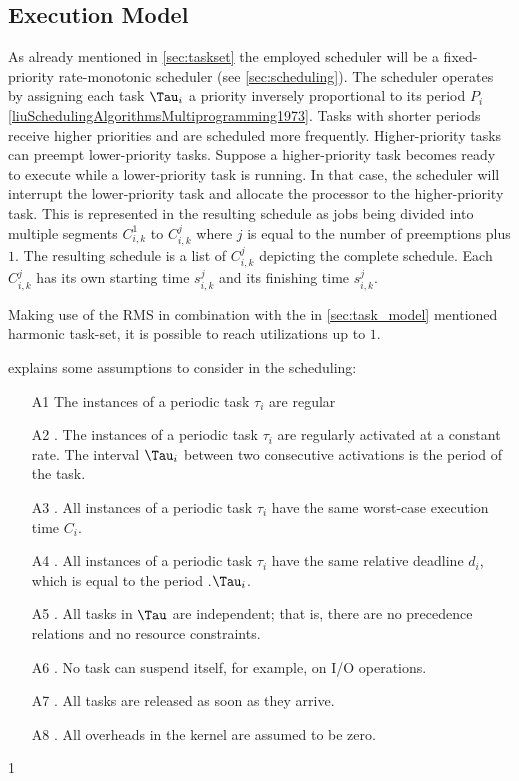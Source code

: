 \subsection{Execution Model}\label{sec:execution_model}
As already mentioned in \cref{sec:taskset} the employed scheduler will be a fixed-priority rate-monotonic scheduler (see \cref{sec:scheduling}).
The scheduler operates by assigning each task $\Tau_i$ a priority inversely proportional to its period $P_i$\ref{liuSchedulingAlgorithmsMultiprogramming1973}.
Tasks with shorter periods receive higher priorities and are scheduled more frequently.
Higher-priority tasks can preempt lower-priority tasks.
Suppose a higher-priority task becomes ready to execute while a lower-priority task is running. In that case, the scheduler will interrupt the lower-priority task and allocate the processor to the higher-priority task.
This is represented in the resulting schedule as jobs being divided into multiple segments $C_{i,k}^1$ to $C_{i,k}^j$ where $j$ is equal to the number of preemptions plus $1$.
The resulting schedule is a list of $C_{i,k}^j$ depicting the complete schedule.
Each $C_{i,k}^j$ has its own starting time $s_{i,k}^j$ and its finishing time $s_{i,k}^j$.

Making use of the \ac{RMS} in combination with the in \cref{sec:task_model} mentioned harmonic task-set, it is possible to reach utilizations up to $1$\cite{liuSchedulingAlgorithmsMultiprogramming1973}.

\textcite[p. 70f]{buttazzoHardRealTimeComputing2024} explains some assumptions to consider in the scheduling:
\begin{enumerate}
  \item[A1] The instances of a periodic task $\tau_i$ are regular
  \item[A2]. The instances of a periodic task $\tau_i$ are regularly activated at a constant rate. The interval $\Tau_i$ between two consecutive activations is the period of the task. 
  \item[A3]. All instances of a periodic task $\tau_i$ have the same worst-case execution time $C_i$.
  \item[A4]. All instances of a periodic task $\tau_i$ have the same relative deadline $d_i$, which is equal to the period .$\Tau_i$. 
  \item[A5]. All tasks in $\Tau$ are independent; that is, there are no precedence relations and no resource constraints.
  \item[A6]. No task can suspend itself, for example, on I/O operations. 
  \item[A7]. All tasks are released as soon as they arrive. 
  \item[A8]. All overheads in the kernel are assumed to be zero. 
\end{enumerate}
1


